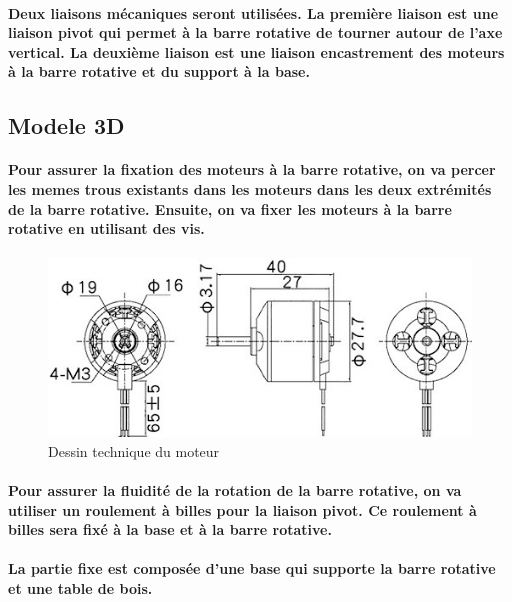 \paragraph{Deux liaisons mécaniques seront utilisées. La première liaison est une liaison pivot qui permet à la barre rotative de tourner autour de l'axe vertical. La deuxième liaison est une liaison encastrement des moteurs à la barre rotative et du support à la base.}

\subsection{Modele 3D}

\paragraph{
	Pour assurer la fixation des moteurs à la barre rotative, on va percer les memes trous existants dans les moteurs dans les deux extrémités de la barre rotative. Ensuite, on va fixer les moteurs à la barre rotative en utilisant des vis.
}
\paragraph*{}
\begin{figure}[!htpb]
	\centering
	\includegraphics[width=0.6\linewidth]{Figures/motor-draw.jpg}
	\caption{Dessin technique du moteur}
	\label{fig:mobile}
\end{figure}

\paragraph{Pour assurer la fluidité de la rotation de la barre rotative, on va utiliser un roulement à billes pour la liaison pivot. Ce roulement à billes sera fixé à la base et à la barre rotative.}

\paragraph{La partie fixe est composée d'une base qui supporte la barre rotative et une table de bois.}
